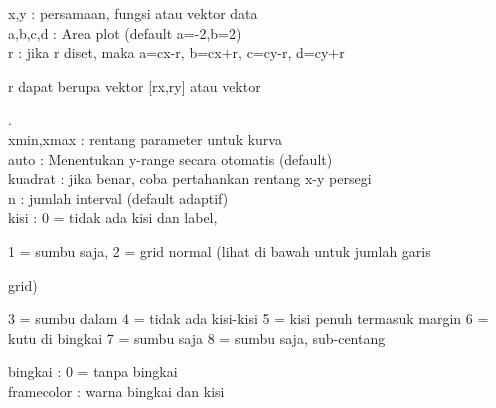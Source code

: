 \documentclass{article}
\begin{document}
\begin{eulernotebook}
\begin{eulercomment}
\begin{eulercomment}
\begin{eulercomment}
\begin{eulercomment}
\begin{eulercomment}
\begin{eulercomment}
\begin{eulercomment}
\begin{eulercomment}
\begin{eulercomment}
\begin{eulercomment}
\begin{eulercomment}
\begin{eulercomment}
\begin{eulercomment}
\begin{eulercomment}
\begin{eulercomment}
\begin{eulercomment}
\begin{eulercomment}
\begin{eulercomment}
\begin{eulercomment}
\begin{eulercomment}
\begin{eulercomment}
\begin{eulercomment}
\begin{eulercomment}
\begin{eulercomment}
\begin{eulercomment}
\begin{eulercomment}
\begin{eulercomment}
\begin{eulercomment}
\begin{eulercomment}
x,y          : persamaan, fungsi atau vektor data\\
a,b,c,d      : Area plot (default a=-2,b=2)\\
r            : jika r diset, maka a=cx-r, b=cx+r, c=cy-r, d=cy+r\\
\end{eulercomment}
\begin{eulerttcomment}
               r dapat berupa vektor [rx,ry] atau vektor
\end{eulerttcomment}
\begin{eulercomment}
[rx1,rx2,ry1,ry2].\\
xmin,xmax    : rentang parameter untuk kurva\\
auto         : Menentukan y-range secara otomatis (default)\\
kuadrat      : jika benar, coba pertahankan rentang x-y persegi\\
n            : jumlah interval (default adaptif)\\
kisi         :      0 = tidak ada kisi dan label,\\
\end{eulercomment}
\begin{eulerttcomment}
                    1 = sumbu saja,
                    2 = grid normal (lihat di bawah untuk jumlah garis
\end{eulerttcomment}
\begin{eulercomment}
grid)\\
\end{eulercomment}
\begin{eulerttcomment}
                    3 = sumbu dalam
                    4 = tidak ada kisi-kisi
                    5 = kisi penuh termasuk margin
                    6 = kutu di bingkai
                    7 = sumbu saja
                    8 = sumbu saja, sub-centang
\end{eulerttcomment}
\begin{eulercomment}
bingkai      : 0 = tanpa bingkai\\
framecolor   : warna bingkai dan kisi\\

\end{eulercomment}
\end{eulercomment}
\end{eulercomment}
\end{eulercomment}
\end{eulercomment}
\end{eulercomment}
\end{eulercomment}
\end{eulercomment}
\end{eulercomment}
\end{eulercomment}
\end{eulercomment}
\end{eulercomment}
\end{eulercomment}
\end{eulercomment}
\end{eulercomment}
\end{eulercomment}
\end{eulercomment}
\end{eulercomment}
\end{eulercomment}
\end{eulercomment}
\end{eulercomment}
\end{eulercomment}
\end{eulercomment}
\end{eulercomment}
\end{eulercomment}
\end{eulercomment}
\end{eulercomment}
\end{eulercomment}
\end{eulercomment}
\end{eulernotebook}
\end{document}
